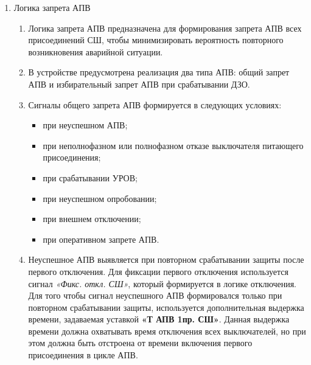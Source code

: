 \color{black}

\begin{enumerate}[label=\arabic{section}.\arabic{subsection}.\arabic{enumi}, labelsep=4pt, leftmargin=0pt, itemindent=57pt, itemsep=0pt, parsep=5pt] %


\item Логика запрета АПВ

\begin{enumerate}[label=\arabic{section}.\arabic{subsection}.\arabic{enumi}.\arabic*, labelsep=4pt, leftmargin=0em, itemindent=65pt, parsep=0pt]

\item
Логика запрета АПВ предназначена для формирования запрета АПВ всех присоединений СШ, чтобы минимизировать вероятность повторного возникновения аварийной ситуации. 

\item
В устройстве предусмотрена реализация два типа АПВ: общий запрет АПВ и избирательный запрет АПВ при срабатывании ДЗО.

\item
Сигналы общего запрета АПВ формируется в следующих условиях:
\begin{itemize}
\item при неуспешном АПВ;
\item при неполнофазном или полнофазном отказе выключателя питающего присоединения;
\item при срабатывании УРОВ;
\item при неуспешном опробовании;
\item при внешнем отключении;
\item при оперативном запрете АПВ.
\end{itemize}

\item
Неуспешное АПВ выявляется при повторном срабатывании защиты после первого отключения.
Для фиксации первого отключения используется сигнал \textit{«Фикс. откл. СШ»}, который формируется в логике отключения.
Для того чтобы сигнал неуспешного АПВ формировался только при повторном срабатывании защиты, используется дополнительная выдержка времени, задаваемая уставкой \textbf{«Т АПВ 1пр. СШ»}.
Данная выдержка времени должна охватывать время отключения всех выключателей, но при этом должна быть отстроена от времени включения первого присоединения в цикле АПВ.


\end{enumerate}
\end{enumerate}
